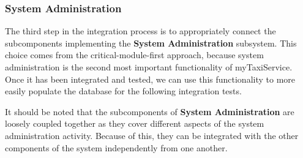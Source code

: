 \subsubsection*{System Administration}
The third step in the integration process is to appropriately connect the subcomponents implementing the \textbf{System Administration} subsystem. This choice comes from the critical-module-first approach, because system administration is the second most important functionality of myTaxiService. Once it has been integrated and tested, we can use this functionality to more easily populate the database for the following integration tests.

It should be noted that the subcomponents of \textbf{System Administration} are loosely coupled together as they cover different aspects of the system administration activity. Because of this, they can be integrated with the other components of the system independently from one another. 

